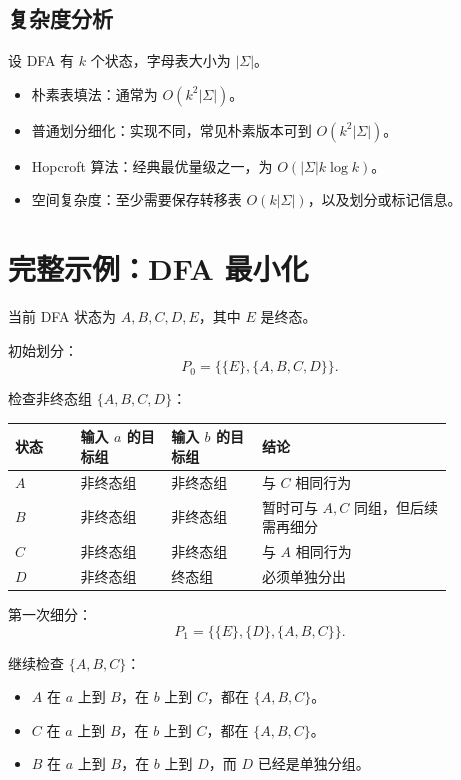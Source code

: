 \documentclass[UTF8,fontset=none,11pt]{ctexart}
\begin{document}
\subsection{复杂度分析}

设 DFA 有 \(k\) 个状态，字母表大小为 \(|\Sigma|\)。

\begin{itemize}
  \item 朴素表填法：通常为 \(O(k^2|\Sigma|)\)。
  \item 普通划分细化：实现不同，常见朴素版本可到 \(O(k^2|\Sigma|)\)。
  \item Hopcroft 算法：经典最优量级之一，为 \(O(|\Sigma|k\log k)\)。
  \item 空间复杂度：至少需要保存转移表 \(O(k|\Sigma|)\)，以及划分或标记信息。
\end{itemize}

\section{完整示例：DFA 最小化}

当前 DFA 状态为 \(A,B,C,D,E\)，其中 \(E\) 是终态。

初始划分：
\[
P_0=\{\{E\},\{A,B,C,D\}\}.
\]

检查非终态组 \(\{A,B,C,D\}\)：

\begin{longtable}{L{0.13\linewidth}L{0.18\linewidth}L{0.18\linewidth}L{0.38\linewidth}}
\toprule
状态 & 输入 \(a\) 的目标组 & 输入 \(b\) 的目标组 & 结论 \\
\midrule
\(A\) & 非终态组 & 非终态组 & 与 \(C\) 相同行为 \\
\(B\) & 非终态组 & 非终态组 & 暂时可与 \(A,C\) 同组，但后续需再细分 \\
\(C\) & 非终态组 & 非终态组 & 与 \(A\) 相同行为 \\
\(D\) & 非终态组 & 终态组 & 必须单独分出 \\
\bottomrule
\end{longtable}

第一次细分：
\[
P_1=\{\{E\},\{D\},\{A,B,C\}\}.
\]

继续检查 \(\{A,B,C\}\)：

\begin{itemize}
  \item \(A\) 在 \(a\) 上到 \(B\)，在 \(b\) 上到 \(C\)，都在 \(\{A,B,C\}\)。
  \item \(C\) 在 \(a\) 上到 \(B\)，在 \(b\) 上到 \(C\)，都在 \(\{A,B,C\}\)。
  \item \(B\) 在 \(a\) 上到 \(B\)，在 \(b\) 上到 \(D\)，而 \(D\) 已经是单独分组。
\end{itemize}
\end{document}
